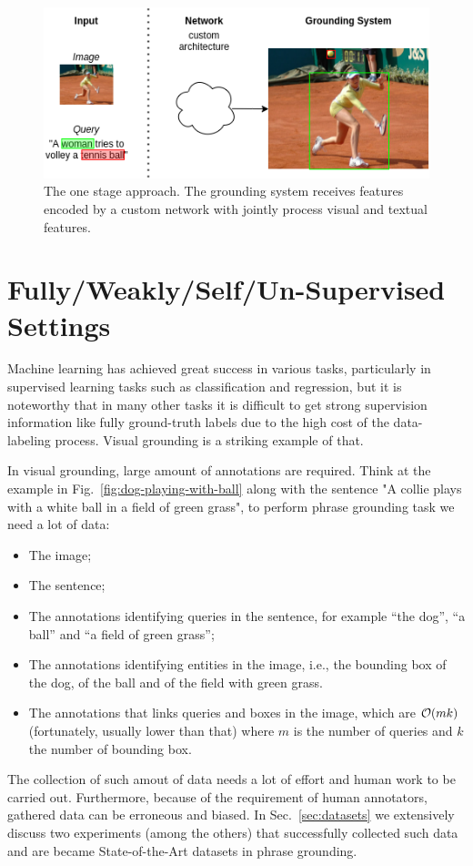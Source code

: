 \begin{figure}
  \centering
  \includegraphics[width=.8\textwidth]{figures/one-stage-approach.png}
  \caption[One stage approach]{
    The one stage approach. The grounding system receives features
    encoded by a custom network with jointly process visual and
    textual features.
  }
  \label{fig:one-stage-approach}
\end{figure}

\section{Fully/Weakly/Self/Un-Supervised Settings}

Machine learning has achieved great success in various tasks,
particularly in supervised learning tasks such as classification and
regression, but it is noteworthy that in many other tasks it is
difficult to get strong supervision information like fully
ground-truth labels due to the high cost of the data-labeling process.
Visual grounding is a striking example of that. 

In visual grounding, large amount of annotations are required. Think at the example in Fig.~\ref{fig:dog-playing-with-ball} along with the sentence "A collie plays with a white ball in a field of green grass", to perform phrase grounding task we need a lot of data: 
\begin{itemize}
  \item The image;
  \item The sentence;
  \item The annotations identifying queries in the sentence, for
  example ``the dog'', ``a ball'' and ``a field of green grass'';
  \item The annotations identifying entities in the image, i.e., the
  bounding box of the dog, of the ball and of the field with green
  grass.
  \item The annotations that links queries and boxes in the image,
  which are $\mathcal{O}(mk)$ (fortunately, usually lower than that) where
  $m$ is the number of queries and $k$ the number of bounding box.
\end{itemize}
The collection of such amout of data needs a lot of effort and human
work to be carried out. Furthermore, because of the requirement of
human annotators, gathered data can be erroneous and biased. In
Sec.~\ref{sec:datasets} we extensively discuss two experiments (among
the others) that successfully collected such data and are became
State-of-the-Art datasets in phrase grounding.

